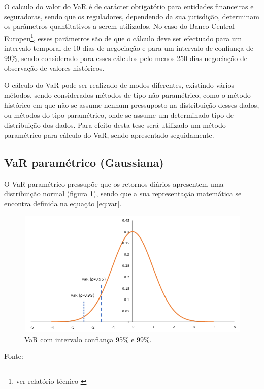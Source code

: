 \documentclass[
  12pt,
  a4paper,
  openany]{book}
\begin{document}
O calculo do valor do VaR é de carácter obrigatório para entidades financeiras e seguradoras, sendo que os reguladores, dependendo da sua jurisdição, determinam os parâmetros quantitativos a serem utilizados.
No caso do Banco Central Europeu\footnote{ver relatório técnico \citet{ecb}}, esses parâmetros são de que o cálculo deve ser efectuado para um intervalo temporal de 10 dias de negociação e para um intervalo de confiança de 99\%, sendo considerado para esses cálculos pelo menos 250 dias negociação de observação de valores históricos.

O cálculo do VaR pode ser realizado de modos diferentes, existindo vários métodos, sendo considerados métodos de tipo não paramétrico, como o método histórico em que não se assume nenhum pressuposto na distribuição desses dados, ou métodos do tipo paramétrico, onde se assume um determinado tipo de distribuição dos dados. Para efeito desta tese será utilizado um método paramétrico para cálculo do VaR, sendo apresentado seguidamente.

\hypertarget{var-paramuxe9trico-gaussiana}{%
\subsection{VaR paramétrico (Gaussiana)}\label{var-paramuxe9trico-gaussiana}}

O VaR paramétrico pressupõe que os retornos diários apresentem uma distribuição normal (figura \ref{fig:var}), sendo que a sua representação matemática se encontra definida na equação \eqref{eq:var}.



\begin{figure}

{\centering \includegraphics[width=0.6\linewidth]{image/VaR} 

}

\caption{VaR com intervalo confiança 95\% e 99\%.}\label{fig:var}
\end{figure}
\FloatBarrier

\centering

Fonte: \citep[pp.13]{phdthesis}
\end{document}
